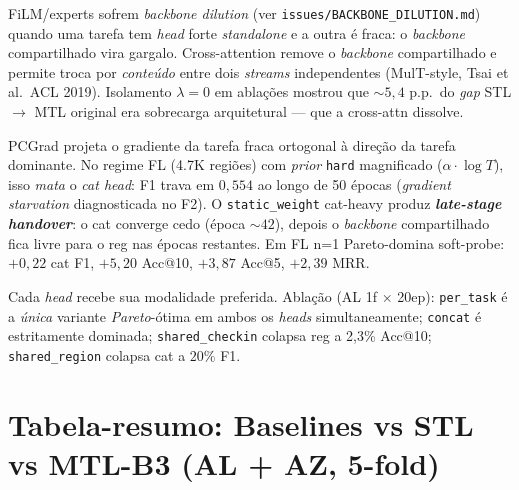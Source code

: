 \documentclass[11pt,a4paper]{article}
\begin{document}
\begin{description}[leftmargin=1em,style=nextline,topsep=0pt]

\item[\texttt{mtlnet\_crossattn} vs FiLM/CGC/MMoE/DSelectK/PLE.] FiLM/experts sofrem \emph{backbone dilution} (ver \texttt{issues/BACKBONE\_DILUTION.md}) quando uma tarefa tem \textit{head} forte \textit{standalone} e a outra é fraca: o \textit{backbone} compartilhado vira gargalo. Cross-attention remove o \textit{backbone} compartilhado e permite troca por \emph{conteúdo} entre dois \textit{streams} independentes (MulT-style, Tsai et al.\ ACL 2019). Isolamento $\lambda=0$ em ablações mostrou que $\sim 5{,}4$ p.p.\ do \textit{gap} STL $\to$ MTL original era sobrecarga arquitetural --- que a cross-attn dissolve.

\item[\texttt{static\_weight} (cat $= 0{,}75$) vs PCGrad.] PCGrad projeta o gradiente da tarefa fraca ortogonal à direção da tarefa dominante. No regime FL (4.7K regiões) com \textit{prior} \texttt{hard} magnificado ($\alpha \cdot \log T$), isso \emph{mata} o \textit{cat head}: F1 trava em $0{,}554$ ao longo de 50 épocas (\textit{gradient starvation} diagnosticada no F2). O \texttt{static\_weight} cat-heavy produz \textbf{\emph{late-stage handover}}: o cat converge cedo (época $\sim 42$), depois o \textit{backbone} compartilhado fica livre para o reg nas épocas restantes. Em FL n=1 Pareto-domina soft-probe: $+0{,}22$ cat F1, $+5{,}20$ Acc@10, $+3{,}87$ Acc@5, $+2{,}39$ MRR.

\item[Per-task input modality (check-in $\to$ cat, region $\to$ reg).] Cada \textit{head} recebe sua modalidade preferida. Ablação (AL 1f $\times$ 20ep): \texttt{per\_task} é a \emph{única} variante \textit{Pareto}-ótima em ambos os \textit{heads} simultaneamente; \texttt{concat} é estritamente dominada; \texttt{shared\_checkin} colapsa reg a 2,3\% Acc@10; \texttt{shared\_region} colapsa cat a $20\%$ F1.

\end{description}

\section{Tabela-resumo: Baselines vs STL vs MTL-B3 (AL + AZ, 5-fold)}
\end{document}
